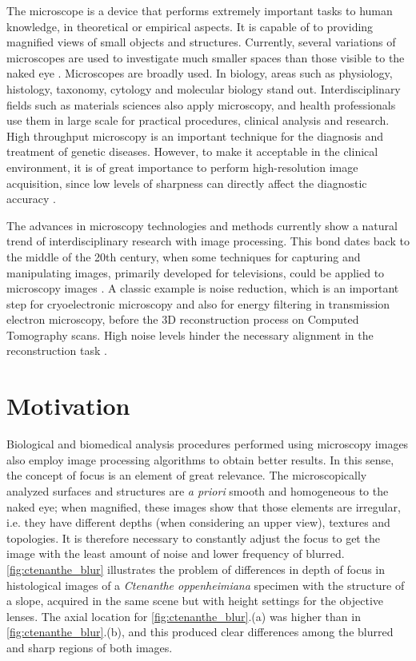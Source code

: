 The microscope is a device that performs extremely important tasks to human knowledge, in theoretical or empirical aspects. It is capable of to providing magnified views of small objects and structures. Currently, several variations of microscopes are used to investigate much smaller spaces than those visible to the naked eye \cite{wu2008microscope}. Microscopes are broadly used. In biology, areas such as physiology, histology, taxonomy, cytology and molecular biology stand out. Interdisciplinary fields such as materials sciences also apply microscopy, and health professionals use them in large scale for practical procedures, clinical analysis and research. High throughput microscopy is an important technique for the diagnosis and treatment of genetic diseases. However, to make it acceptable in the clinical environment, it is of great importance to perform high-resolution image acquisition, since low levels of sharpness can directly affect the diagnostic accuracy \cite{qiu2013evaluations}.

The advances in microscopy technologies and methods currently show a natural trend of interdisciplinary research with image processing. This bond dates back to the middle of the 20th century, when some techniques for capturing and manipulating images, primarily developed for televisions, could be
applied to microscopy images \cite{wu2008microscope}. A classic example is noise reduction, which is an important step for cryoelectronic microscopy and also for energy filtering in transmission electron microscopy, before the 3D reconstruction process on Computed Tomography scans. High noise levels hinder the necessary alignment in the reconstruction task \cite{vyas2017multiscale}.

\section{Motivation}

Biological and biomedical analysis procedures performed using microscopy images also employ image processing algorithms to obtain better results. In this sense, the concept of focus is an element of great relevance. The microscopically analyzed surfaces and structures are \emph{a priori} smooth and homogeneous to the naked eye; when magnified, these images show that those elements are irregular, i.e. they have different depths (when considering an upper view), textures and topologies. It is therefore necessary to constantly adjust the focus to get the image with the least amount of noise and lower frequency of blurred. \autoref{fig:ctenanthe_blur} illustrates the problem of differences in depth of focus in histological images of a \emph{Ctenanthe oppenheimiana} specimen with the structure of a slope, acquired in the same scene but with height settings for the objective lenses. The axial location for \autoref{fig:ctenanthe_blur}.(a) was higher than in \autoref{fig:ctenanthe_blur}.(b), and this produced clear differences among the blurred and sharp regions of both images.

